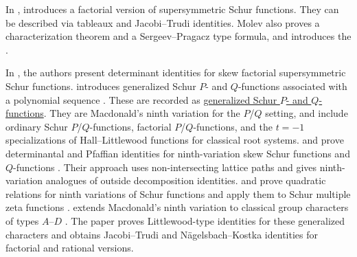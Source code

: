 In \cite[Def.~1.1]{Molev1996},  introduces a factorial
version of supersymmetric Schur functions.
They can be described via tableaux and Jacobi--Trudi identities.
Molev also proves a characterization theorem and a Sergeev--Pragacz type formula,
and introduces the 
\label{shiftedSupersymmetricSchurPolynomial}.


In \cite{FoleyKing2020x}, the authors present determinant identities
for skew factorial supersymmetric Schur functions.
 introduces generalized Schur $P$- and $Q$-functions
associated with a polynomial sequence \cite{Okada2019x}.  These are
recorded as \hyperref[generalizedSchurP]{generalized Schur $P$- and
$Q$-functions}.  They are Macdonald's ninth variation for the $P$/$Q$
setting, and include ordinary Schur $P$/$Q$-functions, factorial
$P$/$Q$-functions, and the $t=-1$ specializations of Hall--Littlewood
functions for classical root systems.
 and  prove determinantal and
Pfaffian identities for ninth-variation skew Schur functions and
$Q$-functions \cite{FoleyKing2021}.  Their approach uses non-intersecting
lattice paths and gives ninth-variation analogues of outside decomposition
identities.
 and  prove quadratic relations
for ninth variations of Schur functions and apply them to Schur multiple
zeta functions \cite{TakedaYamasaki2025x}.
 extends Macdonald's ninth variation to classical
group characters of types $A$--$D$ \cite{Goltsblat2023}.  The paper proves
Littlewood-type identities for these generalized characters and obtains
Jacobi--Trudi and N\"agelsbach--Kostka identities for factorial and rational
versions.
